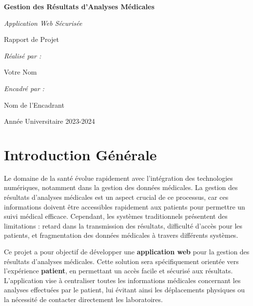 \documentclass[12pt,a4paper]{report}
\begin{document}
\begin{titlepage}
\begin{center}
    \vspace*{2cm}
    {\Huge\bfseries Gestion des Résultats d'Analyses Médicales\par}
    \vspace{2cm}
    {\Large\itshape Application Web Sécurisée\par}
    \vspace{3cm}
    {\Large Rapport de Projet\par}
    \vspace{3cm}
    {\Large\itshape Réalisé par :\par}
    {\Large Votre Nom\par}
    \vspace{1.5cm}
    {\Large\itshape Encadré par :\par}
    {\Large Nom de l'Encadrant\par}
    \vfill
    {\Large Année Universitaire 2023-2024\par}
\end{center}
\end{titlepage}

\tableofcontents
\newpage

\chapter{Introduction Générale}

Le domaine de la santé évolue rapidement avec l'intégration des technologies numériques, notamment dans la gestion des données médicales. La gestion des résultats d'analyses médicales est un aspect crucial de ce processus, car ces informations doivent être accessibles rapidement aux patients pour permettre un suivi médical efficace. Cependant, les systèmes traditionnels présentent des limitations : retard dans la transmission des résultats, difficulté d'accès pour les patients, et fragmentation des données médicales à travers différents systèmes.

Ce projet a pour objectif de développer une \textbf{application web} pour la gestion des résultats d'analyses médicales. Cette solution sera spécifiquement orientée vers l'expérience \textbf{patient}, en permettant un accès facile et sécurisé aux résultats. L'application vise à centraliser toutes les informations médicales concernant les analyses effectuées par le patient, lui évitant ainsi les déplacements physiques ou la nécessité de contacter directement les laboratoires.
\end{document}
